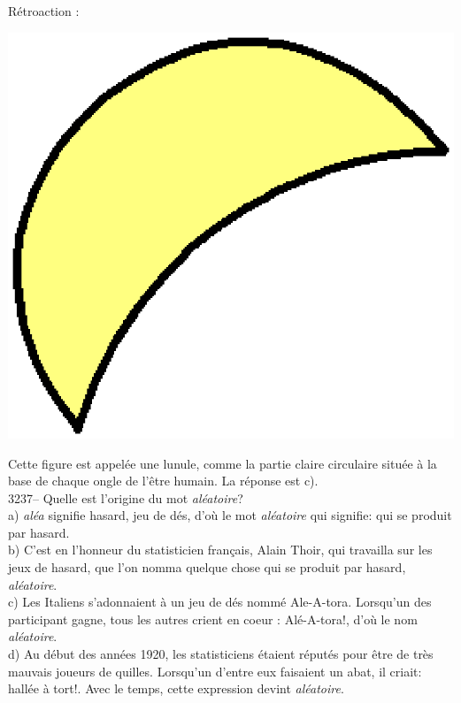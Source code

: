 \documentclass[letterpaper, 12pt]{article}
\begin{document}
R\'etroaction :\\
\begin{center}
\includegraphics[scale=0.25]{lunule.eps}\\[5mm]
\end{center}
Cette figure est appel\'ee une lunule, comme la partie claire circulaire situ\'ee \`a la base de chaque ongle de l'\^etre humain. La r\'eponse est c).\\



3237-- Quelle est l'origine du mot \emph{al\'eatoire}?\\

a) \emph{al\'ea} signifie \og hasard, jeu de d\'es\fg, d'o\`u le mot \emph{al\'eatoire} qui signifie: \og qui se produit par hasard\fg.\\[2mm]
b) C'est en l'honneur du statisticien fran\c cais, Alain Thoir, qui travailla sur les jeux de hasard, que l'on nomma quelque chose qui se produit par hasard, \emph{al\'eatoire}.\\[2mm]
c) Les Italiens s'adonnaient \`a un jeu de d\'es nomm\'e \og Ale-A-tora\fg. Lorsqu'un des participant gagne, tous les autres crient en coeur : Al\'e-A-tora!, d'o\`u le nom \emph{al\'eatoire}.\\[2mm]
d) Au d\'ebut des ann\'ees 1920, les statisticiens \'etaient r\'eput\'es pour \^etre de tr\`es mauvais joueurs de quilles. Lorsqu'un d'entre eux faisaient un abat, il criait: \og hall\'ee \`a tort!\fg. Avec le temps, cette expression devint \emph{al\'eatoire}.\\
\end{document}
